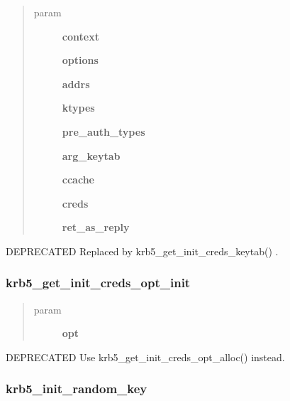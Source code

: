 \documentclass[letterpaper,10pt,english]{sphinxmanual}
\begin{document}
\begin{quote}\begin{description}
\item[{param}] \leavevmode
\textbf{context}

\textbf{options}

\textbf{addrs}

\textbf{ktypes}

\textbf{pre\_auth\_types}

\textbf{arg\_keytab}

\textbf{ccache}

\textbf{creds}

\textbf{ret\_as\_reply}

\end{description}\end{quote}

DEPRECATED Replaced by krb5\_get\_init\_creds\_keytab() .


\subsubsection{krb5\_get\_init\_creds\_opt\_init}
\label{appdev/refs/api/krb5_get_init_creds_opt_init:krb5-get-init-creds-opt-init}\label{appdev/refs/api/krb5_get_init_creds_opt_init::doc}

\begin{fulllineitems}
\label{appdev/refs/api/krb5_get_init_creds_opt_init:krb5_get_init_creds_opt_init}
\end{fulllineitems}

\begin{quote}\begin{description}
\item[{param}] \leavevmode
\textbf{opt}

\end{description}\end{quote}

DEPRECATED Use krb5\_get\_init\_creds\_opt\_alloc() instead.


\subsubsection{krb5\_init\_random\_key}
\label{appdev/refs/api/krb5_init_random_key:krb5-init-random-key}\label{appdev/refs/api/krb5_init_random_key::doc}
\end{document}
